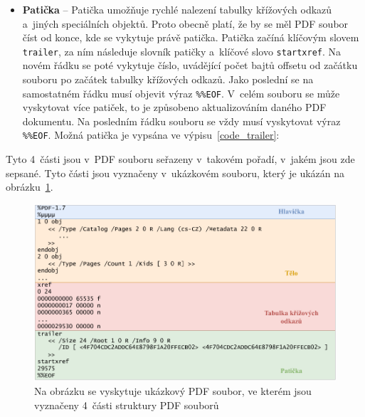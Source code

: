 \begin{itemize}
    \item \textbf{Patička} -- Patička umožňuje rychlé nalezení tabulky křížových
    odkazů a~jiných speciálních objektů. Proto obecně platí, že by se měl PDF
    soubor číst od konce, kde se vykytuje právě patička. Patička začíná klíčovým
    slovem \texttt{trailer}, za ním následuje slovník patičky a~klíčové slovo
    \texttt{startxref}. Na novém řádku se poté vykytuje číslo, uvádějící počet
    bajtů offsetu od začátku souboru po začátek tabulky křížových odkazů. Jako
    poslední se na samostatném řádku musí objevit výraz \texttt{\%\%EOF}.
    V~celém souboru se může vyskytovat více patiček, to je způsobeno aktualizováním
    daného PDF dokumentu. Na posledním řádku souboru se vždy musí vyskytovat
    výraz \texttt{\%\%EOF}. Možná patička je vypsána ve výpisu~\ref{code_trailer}:

\end{itemize}

Tyto 4~části jsou v~PDF souboru seřazeny v~takovém pořadí, v~jakém jsou zde
sepsané. Tyto části jsou vyznačeny v~ukázkovém souboru, který je ukázán
na obrázku~\ref{pic_file_structure}.

\begin{figure}[H]
    \centering
    \includegraphics[width=\linewidth]{obrazky-figures/file_structure.pdf}
    \caption{
        Na obrázku se vyskytuje ukázkový PDF soubor, ve kterém jsou vyznačeny 
        4~části struktury PDF souborů 
    }
    \label{pic_file_structure}
\end{figure}


